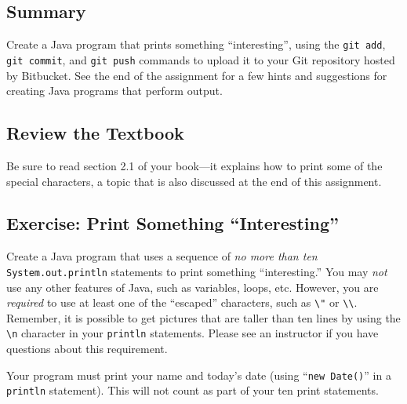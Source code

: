 




\subsection*{Summary}

Create a Java program that prints something ``interesting'', using the {\tt git add}, {\tt git commit}, and {\tt git
  push} commands to upload it to your Git repository hosted by Bitbucket.  See the end of the assignment for a few hints
and suggestions for creating Java programs that perform output.

\subsection*{Review the Textbook}

Be sure to read section 2.1 of your book---it explains how to print some of the special characters, a topic that is also
discussed at the end of this assignment.

\subsection*{Exercise: Print Something ``Interesting''}

Create a Java program that uses a sequence of {\em no more than ten} {\tt System.out.println} statements to print
something ``interesting.'' You may {\em not} use any other features of Java, such as variables, loops, etc.  However,
you are {\em required} to use at least one of the ``escaped'' characters, such as \verb$\"$ or \verb$\\$.  Remember, it
is possible to get pictures that are taller than ten lines by using the \verb$\n$ character in your {\tt println}
statements. Please see an instructor if you have questions about this requirement.

Your program must print your name and today's date (using ``{\tt new Date()}'' in a {\tt println} statement).  This will
not count as part of your ten print statements.

